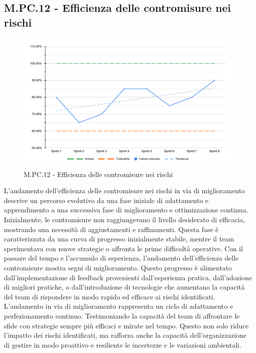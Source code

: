\subsection{M.PC.12 - Efficienza delle contromisure nei rischi}
\begin{figure}[H]
    \centering
    \includegraphics[width=\textwidth]{assets/efficienza_contromisure.pdf}
    \caption{M.PC.12 - Efficienza delle contromisure nei rischi}
\end{figure}

\par L'andamento dell'efficienza delle contromisure nei rischi in via di miglioramento descrive un percorso evolutivo da una fase iniziale di adattamento e apprendimento a una successiva fase di miglioramento e ottimizzazione continua. Inizialmente, le contromisure non raggiungevano il livello desiderato di efficacia, mostrando una necessità di aggiustamenti e raffinamenti. Questa fase è caratterizzata da una curva di progresso inizialmente stabile, mentre il team sperimentava con nuove strategie o affronta le prime difficoltà operative.
Con il passare del tempo e l'accumulo di esperienza, l'andamento dell'efficienza delle contromisure mostra segni di miglioramento. Questo progresso è alimentato dall'implementazione di feedback provenienti dall'esperienza pratica, dall'adozione di migliori pratiche, o dall'introduzione di tecnologie che aumentano la capacità del team di rispondere in modo rapido ed efficace ai rischi identificati.
L'andamento in via di miglioramento rappresenta un ciclo di adattamento e perfezionamento continuo. Testimoniando la capacità del team di affrontare le sfide con strategie sempre più efficaci e mirate nel tempo. Questo non solo riduce l'impatto dei rischi identificati, ma rafforza anche la capacità dell'organizzazione di gestire in modo proattivo e resiliente le incertezze e le variazioni ambientali.
